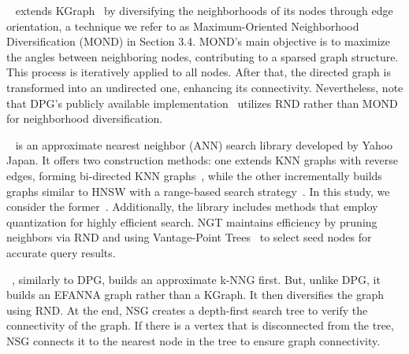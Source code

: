 ~\cite{dpg} 
extends KGraph~\cite{kgraph} by diversifying the neighborhoods of its nodes through edge orientation, a technique we refer to as Maximum-Oriented Neighborhood Diversification (MOND) in Section 3.4.
MOND’s main objective is to maximize the angles between neighboring nodes, contributing to a sparsed graph structure. This process is iteratively applied to all nodes. After that, the directed graph is transformed into an undirected one, enhancing its connectivity. Nevertheless, note that DPG's publicly available implementation~\cite{dpgrepo} utilizes RND rather than MOND for neighborhood diversification.

~\cite{ngt_library} is an approximate nearest neighbor (ANN) search library developed by Yahoo Japan. It offers two construction methods: one extends KNN graphs with reverse edges, forming bi-directed KNN graphs~\cite{ngtpanng1}, while the other incrementally builds graphs similar to HNSW with a range-based search strategy~\cite{ngtpanng2}.  In this study, we consider the former~\cite{ngtpanng1}. Additionally, the library includes methods that employ quantization for highly efficient search.
NGT maintains efficiency by pruning neighbors via RND and using Vantage-Point Trees~\cite{vptree} to select seed nodes for accurate query results.

~\cite{nsg}, similarly to DPG, builds an approximate k-NNG first. But, unlike DPG, it builds an EFANNA graph rather than a KGraph. It then diversifies the graph using RND. 
At the end, NSG creates a depth-first search tree to verify the connectivity of the graph. If there is a vertex that is disconnected from the tree, NSG connects it to the nearest node in the tree to ensure graph connectivity.

